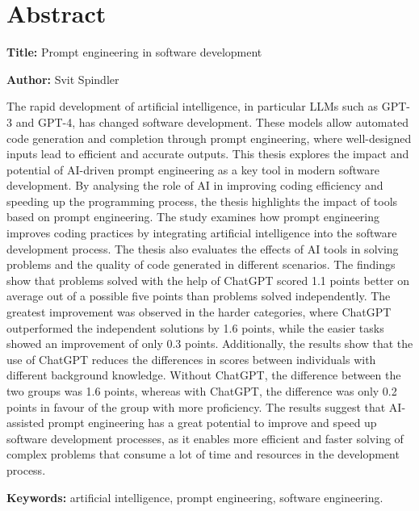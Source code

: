 \documentclass[a4paper,12pt,openright]{book}
\newcommand{\ttitleEn}{Prompt engineering in software development}
\newcommand{\tauthor}{Svit Spindler}
\newcommand{\tkeywordsEn}{artificial intelligence, prompt engineering, software engineering}
\newcommand{\clearemptydoublepage}{\newpage{\pagestyle{empty}\cleardoublepage}}
\begin{document}
{}
\chapter*{Abstract}

\noindent\textbf{Title:} \ttitleEn
\bigskip

\noindent\textbf{Author:} \tauthor
\bigskip

\noindent The rapid development of artificial intelligence, in particular LLMs such as GPT-3 and GPT-4, has changed software development. These models allow automated code generation and completion through prompt engineering, where well-designed inputs lead to efficient and accurate outputs. This thesis explores the impact and potential of AI-driven prompt engineering as a key tool in modern software development. By analysing the role of AI in improving coding efficiency and speeding up the programming process, the thesis highlights the impact of tools based on prompt engineering. The study examines how prompt engineering improves coding practices by integrating artificial intelligence into the software development process. The thesis also evaluates the effects of AI tools in solving problems and the quality of code generated in different scenarios. 
The findings show that problems solved with the help of ChatGPT scored 1.1 points better on average out of a possible five points than problems solved independently. 
The greatest improvement was observed in the harder categories, where ChatGPT outperformed the independent solutions by 1.6 points, while the easier tasks showed an improvement of only 0.3 points.
Additionally, the results show that the use of ChatGPT reduces the differences in scores between individuals with different background knowledge. Without ChatGPT, the difference between the two groups was 1.6 points, whereas with ChatGPT, the difference was only 0.2 points in favour of the group with more proficiency. The results suggest that AI-assisted prompt engineering has a great potential to improve and speed up software development processes, as it enables more efficient and faster solving of complex problems that consume a lot of time and resources in the development process.
\bigskip

\noindent\textbf{Keywords:} \tkeywordsEn.
\clearemptydoublepage

\end{document}
